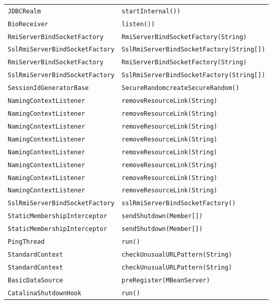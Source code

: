\begin{center}
\begin{longtable}{ll}
\lstinline/JDBCRealm/&{\lstinline/startInternal())/}\\
\lstinline/BioReceiver/&{\lstinline/listen())/}\\
\lstinline/RmiServerBindSocketFactory/&{\lstinline/RmiServerBindSocketFactory(String)/}\\
\lstinline/SslRmiServerBindSocketFactory/&{\lstinline/SslRmiServerBindSocketFactory(String[])/}\\
\lstinline/RmiServerBindSocketFactory/&{\lstinline/RmiServerBindSocketFactory(String)/}\\
\lstinline/SslRmiServerBindSocketFactory/&{\lstinline/SslRmiServerBindSocketFactory(String[])/}\\
\lstinline/SessionIdGeneratorBase/&{\lstinline/SecureRandomcreateSecureRandom()/}\\
\lstinline/NamingContextListener/&{\lstinline/removeResourceLink(String)/}\\
\lstinline/NamingContextListener/&{\lstinline/removeResourceLink(String)/}\\
\lstinline/NamingContextListener/&{\lstinline/removeResourceLink(String)/}\\
\lstinline/NamingContextListener/&{\lstinline/removeResourceLink(String)/}\\
\lstinline/NamingContextListener/&{\lstinline/removeResourceLink(String)/}\\
\lstinline/NamingContextListener/&{\lstinline/removeResourceLink(String)/}\\
\lstinline/NamingContextListener/&{\lstinline/removeResourceLink(String)/}\\
\lstinline/NamingContextListener/&{\lstinline/removeResourceLink(String)/}\\
\lstinline/SslRmiServerBindSocketFactory/&{\lstinline/sslRmiServerBindSocketFactory()/}\\
\lstinline/StaticMembershipInterceptor/&{\lstinline/sendShutdown(Member[])/}\\
\lstinline/StaticMembershipInterceptor/&{\lstinline/sendShutdown(Member[])/}\\
\lstinline/PingThread/&{\lstinline/run()/}\\
\lstinline/StandardContext/&{\lstinline/checkUnusualURLPattern(String)/}\\
\lstinline/StandardContext/&{\lstinline/checkUnusualURLPattern(String)/}\\
\lstinline/BasicDataSource/&{\lstinline/preRegister(MBeanServer)/}\\
\lstinline/CatalinaShutdownHook/&{\lstinline/run()/}\\

\end{longtable}
\end{center}
